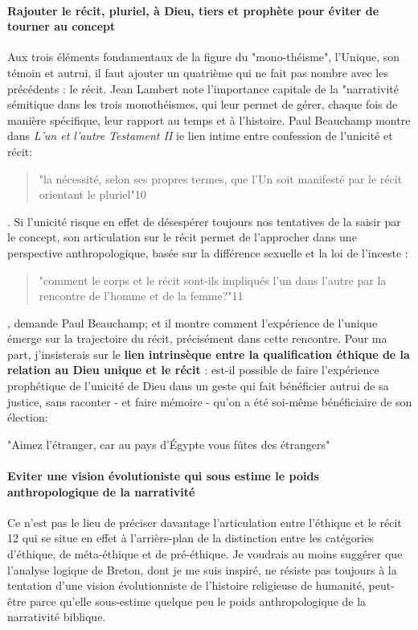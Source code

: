 \paragraph{Rajouter le récit, pluriel, à Dieu, tiers et prophète pour éviter de tourner au concept } Aux trois éléments fondamentaux de la figure du "mono-théisme", l'Unique, son témoin et autrui, il faut ajouter un quatrième qui ne fait pas nombre avec les précédents : le récit. Jean Lambert note l'importance capitale de la "narrativité sémitique dans les trois monothéismes, qui leur permet de gérer, chaque fois de manière spécifique, leur rapport au temps et à l'histoire. Paul Beauchamp montre dans \textit{L'un et l'autre Testament II }ie lien intime entre confession de l'unicité et récit: 
\begin{quote}
    "la nécessité, selon ses propres termes, que l'Un soit manifesté par le récit orientant le pluriel"10
\end{quote}. Si l'unicité risque en effet de désespérer toujours nos tentatives de la saisir par le concept, son articulation sur le récit permet de l'approcher dans une perspective anthropologique, basée sur la différence sexuelle et la loi de l'inceste :
\begin{quote}
    "comment le corps et le récit sont-ils impliqués l'un dans l'autre par la rencontre de l'homme et de la femme?"11
\end{quote}
, demande Paul Beauchamp; et il montre comment l'expérience de l'unique émerge sur la trajectoire du récit, précisément dans cette rencontre. Pour ma part, j'insisterais sur le \textbf{lien intrinsèque entre la qualification éthique de la relation au Dieu unique et le récit }: est-il possible de faire l'expérience prophétique de l'unicité de Dieu dans un geste qui fait bénéficier autrui de sa justice, sans raconter - et faire mémoire - qu'on a été soi-même bénéficiaire de son élection: 
\begin{Ecriture}[Dt 10, 17-19]
    "Aimez l'étranger, car au pays d'Égypte vous fûtes des étrangers" 
\end{Ecriture}

\paragraph{Eviter une vision évolutioniste qui sous estime le poids anthropologique de la narrativité}
Ce n'est pas le lieu de préciser davantage l'articulation entre l'éthique et le récit 12 qui se situe en effet à l'arrière-plan de la distinction entre les catégories d'éthique, de méta-éthique et de pré-éthique. Je voudrais au moins suggérer que l'analyse logique de Breton, dont je me suis inspiré, ne résiste pas toujours à la tentation d'une vision évolutionniste de l'histoire religieuse de humanité, peut-être parce qu'elle sous-estime quelque peu le poids anthropologique de la narrativité biblique. 

